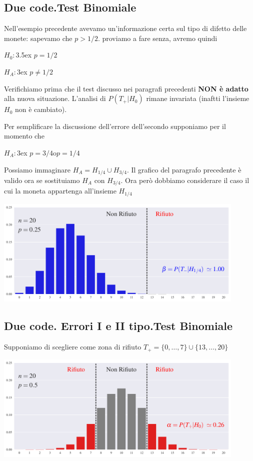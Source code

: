 \documentclass[10pt,openany]{book}
\theoremstyle{mio}
\theoremstyle{liscio}
\begin{document}
\clearpage\subsection{Due code.\hfill Test Binomiale}

Nell'esempio precedente avevamo un'informazione certa sul tipo di difetto delle monete: sapevamo che $p>1/2$. proviamo a fare senza, avremo quindi

$H_0:$\kern3.5ex $p=1/2$

$H_A:$\kern3ex $p\neq1/2$

Verifichiamo prima che il test discusso nei paragrafi precedenti \textbf{NON è adatto\/} alla nuova situazione. L'analisi di $P(T_+|H_0)$ rimane invariata (inaftti l'insieme $H_0$ non è cambiato).

Per semplificare la discussione dell'errore dell'secondo supponiamo per il momento che 

$H_A:$\kern3ex $p=3/4$\quad o\quad $p=1/4$ 

Possiamo immaginare $H_A=H_{{1/4}}\cup H_{{3/4}}$. Il grafico del paragrafo precedente è valido ora se sostituiamo $H_A$ con $H_{{3/4}}$. Ora però dobbiamo considerare il caso il cui la moneta appartenga all'insieme $H_{{1/4}}$

\hfil\includegraphics[width=0.9\textwidth]{figure/B-test_03.pdf}


\clearpage\subsection{Due code. Errori I e II tipo.\hfill Test Binomiale}

Supponiamo di scegliere come zona di rifiuto $T_+=\{0,\dots,7\}\cup \{13,\dots,20\}$

\hfil\includegraphics[width=0.9\textwidth]{figure/B-test_04.pdf}
\end{document}
